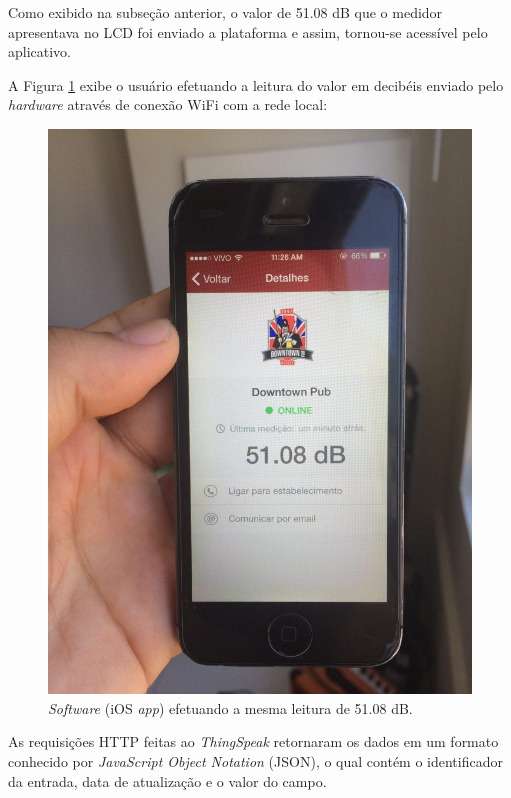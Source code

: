 \documentclass[
    12pt,               %
    openright,          %
    oneside,
    a4paper,            
    english,            %
    brazil              %
    ]{abntex2}
\begin{document}
Como exibido na subseção anterior, o valor de 51.08 dB que o medidor apresentava no LCD foi enviado a plataforma e assim, tornou-se acessível pelo aplicativo. 

A Figura \ref{cinqui} exibe o usuário efetuando a leitura do valor em decibéis enviado pelo \textit{hardware} através de conexão WiFi com a rede local:

\begin{figure}[!htb]
  \begin{center}
    \caption{\label{cinqui}\textit{Software} (iOS \textit{app}) efetuando a mesma leitura de 51.08 dB.}
    \includegraphics[scale=0.18]{images/cinq-real.jpg}
  \end{center}
\end{figure}

As requisições HTTP feitas ao \textit{ThingSpeak} retornaram os dados em um formato conhecido por \textit{JavaScript Object Notation} (JSON), o qual contém o identificador da entrada, data de atualização e o valor do campo. 
\end{document}
